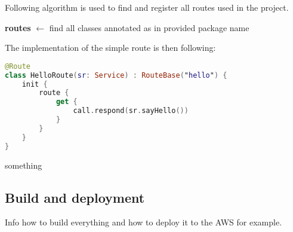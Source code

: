 \medskip \noindent
Following algorithm is used to find and register all routes used in the project.

\begin{algorithm}[H]
	\SetAlgoLined
	\textbf{routes} $\leftarrow$ find all classes annotated as  in provided package name\;
\end{algorithm}
\medskip \noindent
The implementation of the simple route is then following:
\medskip
\begin{lstlisting}[language=Kotlin]
@Route
class HelloRoute(sr: Service) : RouteBase("hello") {
    init {
        route {
            get {
                call.respond(sr.sayHello())
            }
        }
    }
}
\end{lstlisting}

\medskip \noindent
something
 

\subsection{Build and deployment}\label{subsec:build-and-deployment}
Info how to build everything and how to deploy it to the AWS for example.
